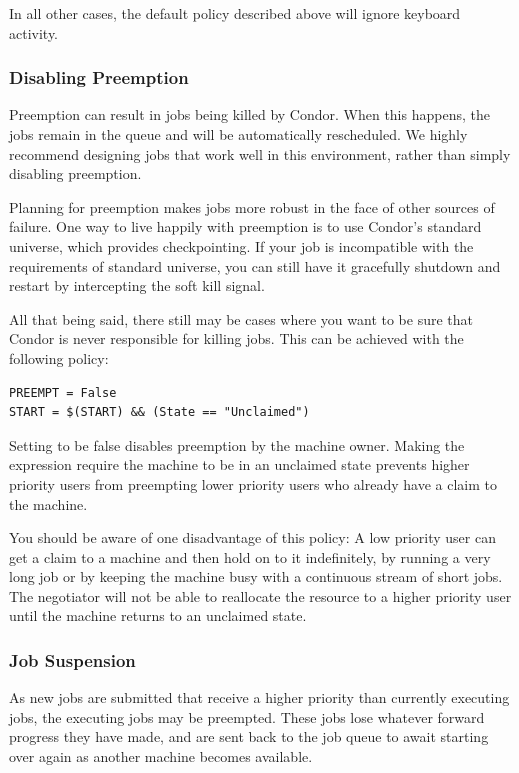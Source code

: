 In all other cases, the default policy described above will ignore
keyboard activity.

\subsubsection{\label{sec:Disabling Preemption}
Disabling Preemption}

Preemption can result in jobs being killed by Condor.  When this
happens, the jobs remain in the queue and will be automatically
rescheduled.  We highly recommend designing jobs that work well in
this environment, rather than simply disabling preemption.

Planning for preemption makes jobs more robust in the face of other
sources of failure.  One way to live happily with preemption is to use
Condor's standard universe, which provides checkpointing.  If your job
is incompatible with the requirements of standard universe, you can
still have it gracefully shutdown and restart by intercepting the soft
kill signal.

All that being said, there still may be cases where you want to be
sure that Condor is never responsible for killing jobs.  This can be
achieved with the following policy:

\begin{verbatim}
PREEMPT = False
START = $(START) && (State == "Unclaimed")
\end{verbatim}

Setting  to be false disables preemption by the machine
owner.  Making the  expression require the machine to be
in an unclaimed state prevents higher priority users from preempting
lower priority users who already have a claim to the machine.

You should be aware of one disadvantage of this policy: A low priority
user can get a claim to a machine and then hold on to it indefinitely,
by running a very long job or by keeping the machine busy with a
continuous stream of short jobs.  The negotiator will not be able to
reallocate the resource to a higher priority user until the machine
returns to an unclaimed state.

\subsubsection{\label{sec:Job-Suspension}Job Suspension}
As new jobs are submitted that receive a higher priority than
currently executing jobs,
the executing jobs may be preempted.
These jobs lose whatever forward progress they have made,
and are sent back to the job queue to await starting over again as
another machine becomes available.


